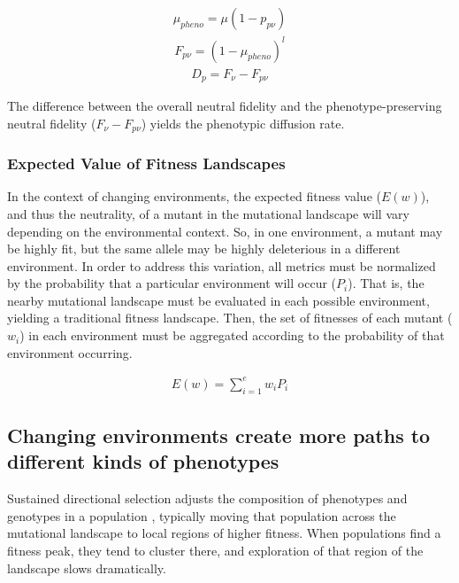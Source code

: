 \documentclass[10pt,letterpaper]{article}
\begin{document}
	\begin{eqnarray}
	\label{eq:phenotypic_mutation_rate}
		\mu_{pheno} = \mu (1- p_{p\nu})
	\end{eqnarray}
	\begin{eqnarray}
	\label{eq:phenotypic_fidelity}
		F_{p\nu} = (1 - \mu_{pheno})^l
	\end{eqnarray}
	\begin{eqnarray}
	\label{eq:phenotypic_diffusion_rate}
		D_p = F_\nu - F_{p\nu}
	\end{eqnarray}

The difference between the overall neutral fidelity and the phenotype-preserving neutral fidelity ($F_\nu - F_{p\nu}$) yields the phenotypic diffusion rate.

\subsubsection*{Expected Value of Fitness Landscapes}
In the context of changing environments, the expected fitness value ($E(w)$), and thus the neutrality, of a mutant in the mutational landscape will vary depending on the environmental context. So, in one environment, a mutant may be highly fit, but the same allele may be highly deleterious in a different environment. In order to address this variation, all metrics must be normalized by the probability that a particular environment will occur ($P_i$). That is, the nearby mutational landscape must be evaluated in each possible environment, yielding a traditional fitness landscape. Then, the set of fitnesses of each mutant ($w_i$) in each environment must be aggregated according to the probability of that environment occurring.

	\begin{eqnarray}
	\label{eq:expected_fitness_value}
		E(w) = \displaystyle\sum_{i=1}^{e} w_i P_i
	\end{eqnarray}

\subsection*{Changing environments create more paths to different kinds of phenotypes}
Sustained directional selection adjusts the composition of phenotypes and genotypes in a population \cite{wright_evolution_1931}, typically moving that population across the mutational landscape to local regions of higher fitness. When populations find a fitness peak, they tend to cluster there, and exploration of that region of the landscape slows dramatically.
\end{document}
